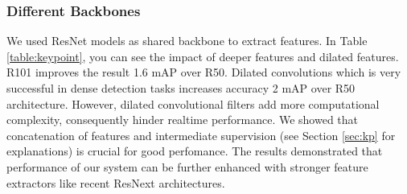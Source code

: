 \documentclass[runningheads]{llncs}
\begin{document}
\subsubsection{Different Backbones}
We used ResNet models\cite{He2016} as shared backbone to extract features. In Table \ref{table:keypoint}, you can see the impact of deeper features and dilated features. R101 improves the result 1.6 mAP over R50. Dilated convolutions \cite{Chen2016} which is very successful in dense detection tasks increases accuracy 2 mAP over R50 architecture. However, dilated convolutional filters add more computational complexity, consequently hinder realtime performance. We showed that concatenation of  features and intermediate supervision (see Section \ref{sec:kp} for explanations) is crucial for good perfomance. The results demonstrated that performance of our system can be further enhanced with stronger feature extractors like recent ResNext \cite{Xie2016} architectures.


\begin{table}
\begin{center}
\caption{\textbf{Left:} Comparison of different keypoint models. \textbf{Right:} Performance of different backbone architectures. \textit{(no concat: no concatenation, no int: no intermediate supervision, dil: dilated, concat: concatenation)}}
\label{table:keypoint}
\quad
{}
\end{center}
\end{table}
\end{document}
